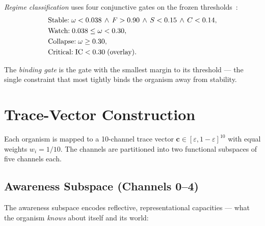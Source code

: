 \documentclass[
  aps,
  prd,
  twocolumn,
  superscriptaddress,
  nofootinbib,
  floatfix
]{revtex4-2}
\newcommand{\eps}{\varepsilon}
\newcommand{\tvec}{\mathbf{c}}
\newcommand{\IC}{\mathrm{IC}}
\begin{document}
\emph{Regime classification} uses four conjunctive gates
on the frozen thresholds~\cite{paulus2025umcp}:
\begin{align}
  &\text{Stable:}\;
    \omega < 0.038 \,\wedge\, F > 0.90
    \,\wedge\, S < 0.15 \,\wedge\, C < 0.14, \notag\\
  &\text{Watch:}\;
    0.038 \le \omega < 0.30, \notag\\
  &\text{Collapse:}\;
    \omega \ge 0.30, \notag\\
  &\text{Critical:}\;
    \IC < 0.30 \;\text{(overlay)}. \label{eq:regimes}
\end{align}

The \emph{binding gate} is the gate with the smallest margin
to its threshold --- the single constraint that most tightly
binds the organism away from stability.

\section{Trace-Vector Construction}\label{sec:trace}

Each organism is mapped to a 10-channel trace vector
$\tvec \in [\eps, 1{-}\eps]^{10}$ with equal weights
$w_i = 1/10$.  The channels are partitioned into two
functional subspaces of five channels each.

\subsection{Awareness Subspace (Channels 0--4)}

The awareness subspace encodes reflective, representational
capacities --- what the organism \emph{knows} about itself
and its world:
\end{document}
